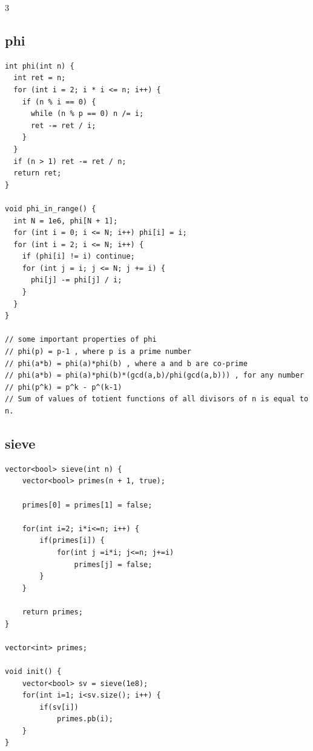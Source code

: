 \documentclass[twoside]{article}
\begin{document}
\begin{multicols*}{3}
{\subsection*{phi}
}
\begin{verbatim}
int phi(int n) {
  int ret = n;
  for (int i = 2; i * i <= n; i++) {
    if (n % i == 0) {
      while (n % p == 0) n /= i;
      ret -= ret / i;
    }
  }
  if (n > 1) ret -= ret / n;
  return ret;
}

void phi_in_range() {
  int N = 1e6, phi[N + 1];
  for (int i = 0; i <= N; i++) phi[i] = i;
  for (int i = 2; i <= N; i++) {
    if (phi[i] != i) continue;
    for (int j = i; j <= N; j += i) {
      phi[j] -= phi[j] / i;
    }
  }
}

// some important properties of phi
// phi(p) = p-1 , where p is a prime number
// phi(a*b) = phi(a)*phi(b) , where a and b are co-prime
// phi(a*b) = phi(a)*phi(b)*(gcd(a,b)/phi(gcd(a,b))) , for any number
// phi(p^k) = p^k - p^(k-1) 
// Sum of values of totient functions of all divisors of n is equal to n.
\end{verbatim}

{
\subsection*{sieve}
}
\begin{verbatim}
vector<bool> sieve(int n) {
    vector<bool> primes(n + 1, true);
 
    primes[0] = primes[1] = false;
 
    for(int i=2; i*i<=n; i++) {
        if(primes[i]) {
            for(int j =i*i; j<=n; j+=i)
                primes[j] = false;
        }
    }
    
    return primes;
}
 
vector<int> primes;
 
void init() {
    vector<bool> sv = sieve(1e8);
    for(int i=1; i<sv.size(); i++) {
        if(sv[i])
            primes.pb(i);
    }
}
\end{verbatim}

{
}
\end{multicols*}
\end{document}
